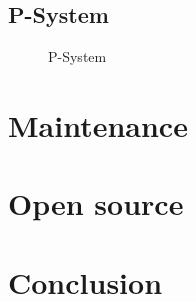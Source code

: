 \documentclass{style/CRPITStyle}
\renewcommand{\cite}{\citep}
\begin{document}
\vspace{.1in}

\subsection{P-System}

\vspace{.1in}

\begin{figure}[htb]
\caption{\protect\label{p-system}  P-System }
\end{figure}

\vspace{.1in}

\section{Maintenance}

\section{Open source}

\cite{raymond:1999}

\section{Conclusion}



\end{document}
